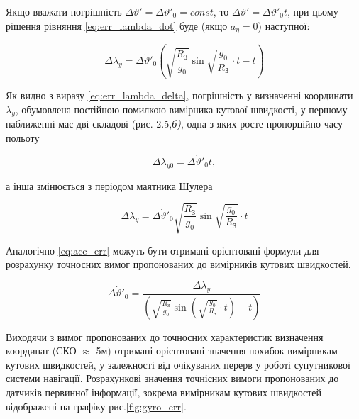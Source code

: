 Якщо вважати погрішність $\Delta \dot{\vartheta }'=\Delta \dot{\vartheta }'_{0} =const$, то $\Delta \vartheta '=\Delta \dot{\vartheta }'_{0} t$, 
при цьому рішення рівняння 
\eqref{eq:err_lambda_dot} буде (якщо $a_{\eta } =0$) наступної:

\begin{equation} 
\label{eq:err_lambda_delta} 
\Delta \lambda _{y} =\Delta \dot{\vartheta }'_{0} \left(\sqrt{\frac{R_{\text{З}} }{g_{0} } } \sin \sqrt{\frac{g_{0} }{R_{\text{З}} } } \cdot t-t\right)
\end{equation} 


Як видно з виразу \eqref{eq:err_lambda_delta},  погрішність у визначенні координати  $\lambda _{y} $, обумовлена 
постійною  помилкою  вимірника кутової швидкості, у першому наближенні має дві складові (рис. 2.5,\textit{б)}, 
одна  з яких  росте пропорційно  часу польоту

\[\Delta \lambda _{y0} =\Delta \dot{\vartheta }'_{0} t,\] 

а інша  змінюється з періодом маятника Шулера

\[\Delta \lambda _{y} =\Delta \dot{\vartheta }'_{0} \sqrt{\frac{R_{\text{З}} }{g_{0} } } \sin \sqrt{\frac{g_{0} }{R_{\text{З}} } } \cdot t\] 


Аналогічно \eqref{eq:acc_err} можуть бути отримані орієнтовані формули для розрахунку точносних вимог 
пропонованих до вимірників кутових швидкостей.

\[\Delta \dot{\vartheta }'_{0} =\frac{\Delta \lambda _{y} }{\left(\sqrt{\frac{R_{{\text{З}}} }{g_{0} } } \sin \left(\sqrt{\frac{g_{0} }{R_{{\text{З}}} } } \cdot t\right)-t\right)} \] 

Виходячи з вимог пропонованих до точносних характеристик визначення координат (СКО $\approx$ 5м) 
отримані орієнтовані значення похибок вимірникам кутових швидкостей, у залежності від очікуваних 
перерв у роботі супутникової системи навігації. Розрахункові значення точнісних вимоги пропонованих 
до датчиків первинної інформації, зокрема вимірникам кутових швидкостей відображені на графіку рис.\ref{fig:gyro_err}.

